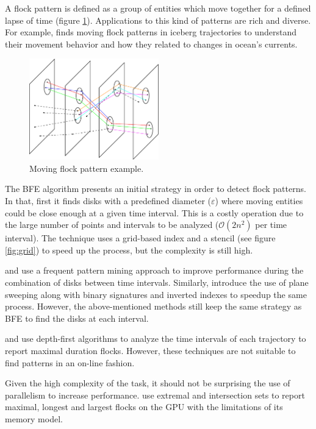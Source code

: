 \documentclass[12pt]{scrartcl}
\begin{document}
A flock pattern is defined as a group of entities which move together for a defined lapse of time \citep{benkert_reporting_2008} (figure \ref{fig:flock}).  Applications to this kind of patterns are rich and diverse.  For example, \citep{calderon_romero_mining_2011} finds moving flock patterns in iceberg trajectories to understand their movement behavior and how they related to changes in ocean's currents. 

\begin{figure}
 \centering
 \includegraphics[width=0.5\textwidth]{./figures/flock}
 \caption{Moving flock pattern example.}
 \label{fig:flock}
\end{figure}
 
The BFE algorithm presents an initial strategy in order to detect flock patterns.  In that, first it finds disks with a predefined diameter ($\varepsilon$) where moving entities could be close enough at a given time interval.  This is a costly operation due to the large number of points and intervals to be analyzed ($\mathcal{O}(2n^2)$ per time interval).  The technique uses a grid-based index and a stencil (see figure \ref{fig:grid}) to speed up the process, but the complexity is still high.

\cite{calderon_romero_mining_2011} and \cite{turdukulov_visual_2014} use a frequent pattern mining approach to improve performance during the combination of disks between time intervals.  Similarly, \cite{tanaka_improved_2016} introduce the use of plane sweeping along with binary signatures and inverted indexes to speedup the same process.  However, the above-mentioned methods still keep the same strategy as BFE to find the disks at each interval.  

\cite{arimura_finding_2014} and \cite{geng_enumeration_2014} use depth-first algorithms to analyze the time intervals of each trajectory to report maximal duration flocks.  However, these techniques are not suitable to find patterns in an on-line fashion.

Given the high complexity of the task, it should not be surprising the use of parallelism to increase performance.  \cite{fort_parallel_2014} use extremal and intersection sets to report maximal, longest and largest flocks on the GPU with the limitations of its memory model.  
\end{document}
